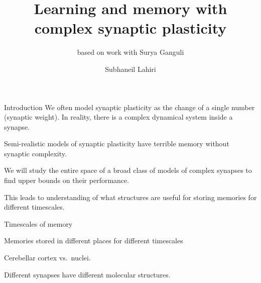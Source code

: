 \documentclass{beamer}%
\title[Complex synapses]{Learning and memory with complex synaptic plasticity}
\subtitle{\small{based on work with Surya Ganguli}
}
\author{Subhaneil Lahiri%
}
\institute[Stanford]{%
Stanford University, Applied Physics
}
\begin{document}

\begin{frame}
%
 \titlepage
%
\end{frame}


\begin{frame}{Introduction}
%
 We often model synaptic plasticity as the change of a single number (synaptic weight).
 In reality, there is a complex dynamical system inside a synapse.

 \vp Semi-realistic models of synaptic plasticity have terrible memory without synaptic complexity.

 \vp We will study the entire space of a broad class of models of complex synapses to find upper bounds on their performance.

 \vp This leads to understanding of what structures are useful for storing memories for different timescales.
%
\end{frame}


\begin{frame}{Timescales of memory}
%
 \parbox[t]{0.47\linewidth}{
 Memories stored in different places for different timescales
 
 
 \begin{center}
 \end{center}

 \cf Cerebellar cortex vs.\ nuclei.

 }
 \hspace{0.03\linewidth}
 \parbox[t]{0.47\linewidth}{
 Different synapses have different molecular structures.
 \begin{center}
 \end{center}
 }
%
\end{frame}

\end{document}

